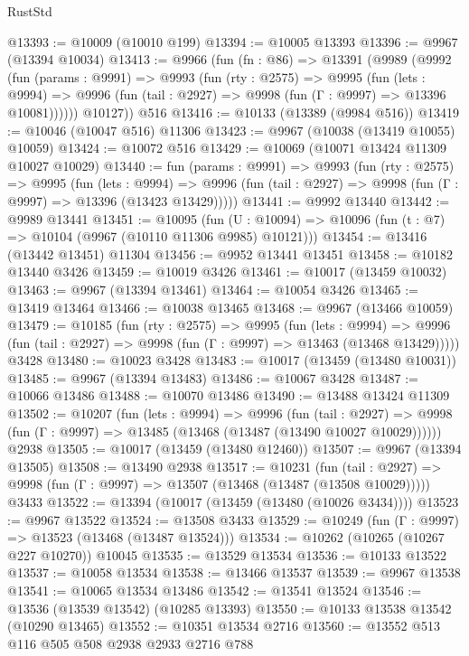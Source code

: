 \begin{lexlean}{RustStd}
\begin{coremodule}
@13393 := @10009 (@10010 @199)
@13394 := @10005 @13393
@13396 := @9967 (@13394 @10034)
@13413 := @9966
    (fun (fn : @86) =>
    @13391
      (@9989
        (@9992
          (fun (params : @9991) =>
          @9993
            (fun (rty : @2575) =>
            @9995
              (fun (lets : @9994) =>
              @9996 (fun (tail : @2927) => @9998 (fun (Γ : @9997) => @13396 @10081))))))
        @10127))
    @516
@13416 := @10133 (@13389 (@9984 @516))
@13419 := @10046 (@10047 @516) @11306
@13423 := @9967 (@10038 (@13419 @10055) @10059)
@13424 := @10072 @516
@13429 := @10069 (@10071 @13424 @11309 @10027 @10029)
@13440 := fun (params : @9991) =>
  @9993
    (fun (rty : @2575) =>
    @9995
      (fun (lets : @9994) =>
      @9996 (fun (tail : @2927) => @9998 (fun (Γ : @9997) => @13396 (@13423 @13429)))))
@13441 := @9992 @13440
@13442 := @9989 @13441
@13451 := @10095
    (fun (U : @10094) => @10096 (fun (t : @7) => @10104 (@9967 (@10110 @11306 @9985) @10121)))
@13454 := @13416 (@13442 @13451) @11304
@13456 := @9952 @13441 @13451
@13458 := @10182 @13440 @3426
@13459 := @10019 @3426
@13461 := @10017 (@13459 @10032)
@13463 := @9967 (@13394 @13461)
@13464 := @10054 @3426
@13465 := @13419 @13464
@13466 := @10038 @13465
@13468 := @9967 (@13466 @10059)
@13479 := @10185
    (fun (rty : @2575) =>
    @9995
      (fun (lets : @9994) =>
      @9996 (fun (tail : @2927) => @9998 (fun (Γ : @9997) => @13463 (@13468 @13429)))))
    @3428
@13480 := @10023 @3428
@13483 := @10017 (@13459 (@13480 @10031))
@13485 := @9967 (@13394 @13483)
@13486 := @10067 @3428
@13487 := @10066 @13486
@13488 := @10070 @13486
@13490 := @13488 @13424 @11309
@13502 := @10207
    (fun (lets : @9994) =>
    @9996
      (fun (tail : @2927) =>
      @9998 (fun (Γ : @9997) => @13485 (@13468 (@13487 (@13490 @10027 @10029))))))
    @2938
@13505 := @10017 (@13459 (@13480 @12460))
@13507 := @9967 (@13394 @13505)
@13508 := @13490 @2938
@13517 := @10231
    (fun (tail : @2927) => @9998 (fun (Γ : @9997) => @13507 (@13468 (@13487 (@13508 @10029)))))
    @3433
@13522 := @13394 (@10017 (@13459 (@13480 (@10026 @3434))))
@13523 := @9967 @13522
@13524 := @13508 @3433
@13529 := @10249 (fun (Γ : @9997) => @13523 (@13468 (@13487 @13524)))
@13534 := @10262 (@10265 (@10267 @227 @10270)) @10045
@13535 := @13529 @13534
@13536 := @10133 @13522
@13537 := @10058 @13534
@13538 := @13466 @13537
@13539 := @9967 @13538
@13541 := @10065 @13534 @13486
@13542 := @13541 @13524
@13546 := @13536 (@13539 @13542) (@10285 @13393)
@13550 := @10133 @13538 @13542 (@10290 @13465)
@13552 := @10351 @13534 @2716
@13560 := @13552 @513 @116 @505 @508 @2938 @2933 @2716 @788

\end{coremodule}
\end{lexlean}
